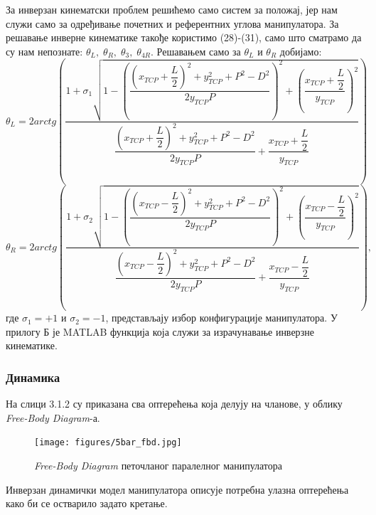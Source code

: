 \documentclass[12pt]{article}
\begin{document}
За инверзан кинематски проблем решићемо само систем за положај, јер нам служи само за одређивање почетних и референтних углова манипулатора. За решавање инверне кинематике такође користимо (28)-(31), само што сматрамо да су нам непознате: $\theta_L,\;\theta_R,\;\theta_3,\;\theta_{4R}$. Решавањем само за $\theta_L$ и $\theta_R$ добијамо:
\begin{equation}
    \theta_L = 2arctg\left(\dfrac{1 + \sigma_1\sqrt{1 - \left(\dfrac{\left(x_{TCP}+\dfrac{L}{2}\right)^2 + y_{TCP}^2 + P^2 - D^2}{2y_{TCP}P}\right)^2+\left(\dfrac{x_{TCP}+\dfrac{L}{2}}
    {y_{TCP}}\right)^2}}
    {\dfrac{\left(x_{TCP}+\dfrac{L}{2}\right)^2 + y_{TCP}^2 + P^2 - D^2}{2y_{TCP}P} + \dfrac{x_{TCP}+\dfrac{L}{2}}
    {y_{TCP}}}\right)
\end{equation}
\begin{equation}
    \theta_R = 2arctg\left(\dfrac{1 + \sigma_2\sqrt{1 - \left(\dfrac{\left(x_{TCP}-\dfrac{L}{2}\right)^2 + y_{TCP}^2 + P^2 - D^2}{2y_{TCP}P}\right)^2+\left(\dfrac{x_{TCP}-\dfrac{L}{2}}
    {y_{TCP}}\right)^2}}
    {\dfrac{\left(x_{TCP}-\dfrac{L}{2}\right)^2 + y_{TCP}^2 + P^2 - D^2}{2y_{TCP}P} + \dfrac{x_{TCP}-\dfrac{L}{2}}
    {y_{TCP}}}\right),
\end{equation}
где $\sigma_1=+1$ и $\sigma_2=-1$, представљају избор конфигурације манипулатора.
У прилогу Б је MATLAB функција која служи за израчунавање инверзне кинематике.

\newpage
\subsubsection{Динамика}
На слици 3.1.2 су приказана сва оптерећења која делују на чланове, у облику \textit{Free-Body Diagram}-а.
\begin{figure}[H]
    \centering
    \texttt{[image: figures/5bar\_fbd.jpg]}
    \caption{\textit{Free-Body Diagram} петочланог паралелног манипулатора}
    \label{fig:5bar_fbd}
\end{figure}

Инверзан динамички модел манипулатора описује потребна улазна оптерећења како би се остварило задато кретање.
\end{document}
